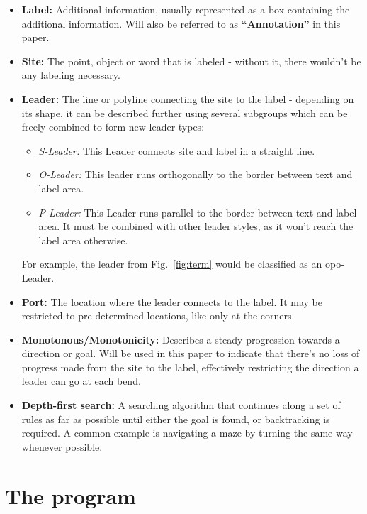 \documentclass[11pt,a4paper]{vutinfth}
\begin{document}
\begin{itemize}
 \item \textbf{Label:} Additional information, usually represented as a box containing the additional information. Will also be referred to as \textbf{``Annotation''} in this paper.
 \item \textbf{Site:} The point, object or word that is labeled - without it, there wouldn't be any labeling necessary.
 \item \textbf{Leader:} The line or polyline connecting the site to the label - depending on its shape, it can be described further using several subgroups which can be freely combined to form new leader types:
  \begin{itemize}
   \item \textit{S-Leader:} This Leader connects site and label in a straight line.
   \item \textit{O-Leader:} This leader runs orthogonally to the border between text and label area.
   \item \textit{P-Leader:} This Leader runs parallel to the border between text and label area. It must be combined with other leader styles, as it won't reach the label area otherwise.
  \end{itemize}
    For example, the leader from Fig.~\ref{fig:term} would be classified as an opo-Leader.
 \item \textbf{Port:} The location where the leader connects to the label. It may be restricted to pre-determined locations, like only at the corners.
  \item \textbf{Monotonous/Monotonicity:} Describes a steady progression towards a direction or goal. Will be used in this paper to indicate that there's no loss of progress made from the site to the label, effectively restricting the direction a leader can go at each bend.
  \item \textbf{Depth-first search:} A searching algorithm that continues along a set of rules as far as possible until either the goal is found, or backtracking is required. A common example is navigating a maze by turning the same way whenever possible.
\end{itemize}

\section{The program}
\end{document}
